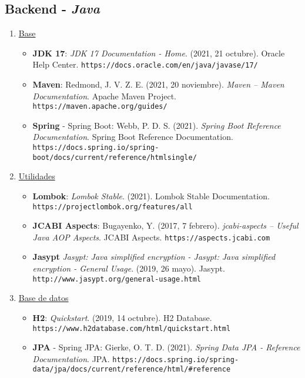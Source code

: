 \documentclass[../ei103948-project-documentation.tex]{subfiles}
\begin{document}
    \subsection{Backend - \textit{Java}}
        \begin{enumerate}
            \item \underline{Base}
                \begin{itemize}
                    \item [\faIcon{book}] \textbf{JDK 17}: \textit{JDK 17 Documentation - Home}. (2021, 21 octubre). Oracle Help Center. \texttt{https://docs.oracle.com/en/java/javase/17/}
                    \item [\faIcon{book}] \textbf{Maven}: Redmond, J. V. Z. E. (2021, 20 noviembre).\textit{ Maven – Maven Documentation}. Apache Maven Project. \texttt{https://maven.apache.org/guides/}
                    \item [\faIcon{book}] \textbf{Spring} - Spring Boot: Webb, P. D. S. (2021). \textit{Spring Boot Reference Documentation}. Spring Boot Reference Documentation. \texttt{https://docs.spring.io/spring-boot/docs/current/reference/htmlsingle/}
                \end{itemize}
            \item \underline{Utilidades}
                \begin{itemize}
                    \item [\faIcon{book}] \textbf{Lombok}: \textit{Lombok Stable}. (2021). Lombok Stable Documentation. \texttt{https://projectlombok.org/features/all}
                    \item [\faIcon{book}] \textbf{JCABI Aspects}: Bugayenko, Y. (2017, 7 febrero). \textit{jcabi-aspects – Useful Java AOP Aspects}. JCABI Aspects. \texttt{https://aspects.jcabi.com}
                    \item [\faIcon{book}] \textbf{Jasypt} \textit{Jasypt: Java simplified encryption - Jasypt: Java simplified encryption - General Usage}. (2019, 26 mayo). Jasypt. \texttt{http://www.jasypt.org/general-usage.html}
                \end{itemize}
            \item \underline{Base de datos}
                \begin{itemize}
                    \item [\faIcon{book}] \textbf{H2}: \textit{Quickstart}. (2019, 14 octubre). H2 Database. \texttt{https://www.h2database.com/html/quickstart.html}
                    \item [\faIcon{book}] \textbf{JPA} - Spring JPA: Gierke, O. T. D. (2021). \textit{Spring Data JPA - Reference Documentation}. JPA. \texttt{https://docs.spring.io/spring-data/jpa/docs/current/reference/html/\#reference}

\end{itemize}
\end{enumerate}
\end{document}
